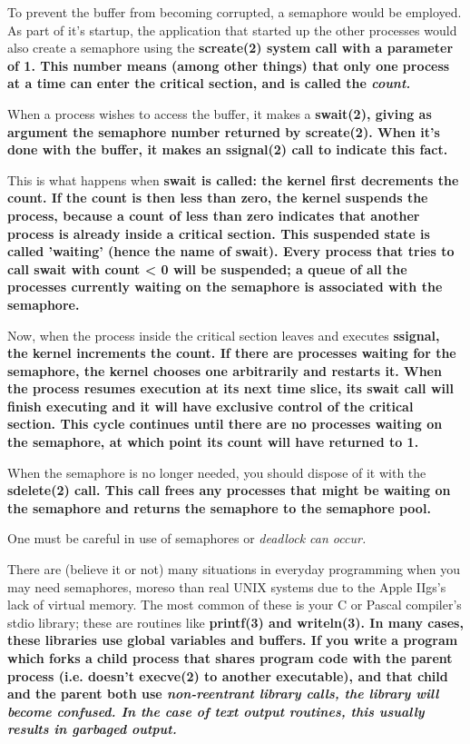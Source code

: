 \documentclass{report}
\begin{document}
To prevent the buffer from becoming
corrupted, a semaphore would be employed. As part of it's
startup, the application that started up the other processes
would also create a semaphore using the \bf screate\rm(2) system
call with a parameter of 1. This number means (among other
things) that only one process at a time can enter the critical
section, and is called the \it count\rm.

When a process wishes to access the buffer,
it makes a \bf swait\rm(2), giving as argument the semaphore
number returned by \bf screate\rm(2). When it's done with the
buffer, it makes an \bf ssignal\rm(2) call to indicate this fact.

This is what happens when \bf swait \rm is
called: the kernel first decrements the count. If the count is
then less than zero, the kernel suspends the process, because a
count of less than zero indicates that another process is already
inside a critical section. This suspended state is called
'waiting' (hence the name of \bf swait\rm). Every process that
tries to call \bf swait \rm with count < 0 will be suspended;
a queue of all the processes currently waiting on the semaphore
is associated with the semaphore.

Now, when the process inside the critical
section leaves and executes \bf ssignal\rm, the kernel
increments the count. If there are processes waiting for the
semaphore, the kernel chooses one arbitrarily and restarts it.
When the process resumes execution at its next time slice, its 
\bf swait \rm
call will finish executing and it will have exclusive control of
the critical section. This cycle continues until there are no
processes waiting on the semaphore, at which point its count will
have returned to 1.

When the semaphore is no longer needed, you
should dispose of it with the \bf sdelete\rm(2) call. This call
frees any processes that might be waiting on the semaphore and
returns the semaphore to the semaphore pool.

One must be careful in use of semaphores or
\it deadlock \rm can occur.

There are (believe it or not) many
situations in everyday programming when you may need semaphores,
moreso than real UNIX systems due to the Apple IIgs's lack of
virtual memory. The most common of these is your C or Pascal
compiler's stdio library; these are routines like \bf printf\rm(3)
and \bf writeln\rm(3). In many cases, these libraries use global
variables and buffers. If you write a program which forks a 
child process that shares program code with the parent process (i.e.
doesn't \bf execve\rm(2) to another executable), and that child
and the parent both use \it non-reentrant \rm library calls, the
library will become confused. In the case of text output
routines, this usually results in garbaged output.
\end{document}
